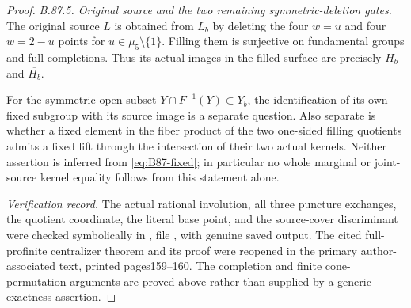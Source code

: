\begin{proof}
\emph{B.87.5. Original source and the two remaining symmetric-deletion gates.}
The original source $L$ is obtained from $L_b$ by deleting the four
$w=u$ and four $w=2-u$ points for $u\in\mu _5\setminus\{1\}$.
Filling them is surjective on fundamental groups and full completions.
Thus its actual images in the filled surface are precisely $H_b$ and
$\overline{H_b}$.

For the symmetric open subset $Y\cap F^{-1}(Y)\subset Y_b$, the
identification of its own fixed subgroup with its source image is a
separate question. Also separate is whether a fixed element in the
fiber product of the two one-sided filling quotients admits a fixed lift
through the intersection of their two actual kernels. Neither assertion
is inferred from \eqref{eq:B87-fixed}; in particular no whole marginal
or joint-source kernel equality follows from this statement alone.

\emph{Verification record.}
The actual rational involution, all three puncture exchanges, the quotient
coordinate, the literal base point, and the source-cover discriminant
were checked symbolically in , file
, with genuine saved output.
The cited full-profinite centralizer theorem and its proof were reopened
in the primary author-associated text, printed pages159--160. The
completion and finite cone-permutation arguments are proved above rather
than supplied by a generic exactness assertion.
\end{proof}
